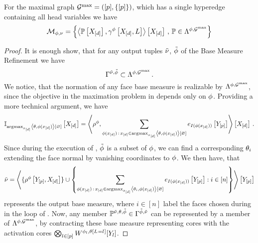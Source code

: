 \begin{theorem}%
	For the maximal graph $\mathcal{G}^{\mathrm{max}}=([p],\{[p]\})$, which has a single hyperedge containing all head variables we have
	\begin{align*}
		\mathcal{M}_{\phi,\nu} = \left\{ \left\langle \mathbb{P}\left[X_{[d]}\right],\gamma^{\phi}\left[X_{[d]},L\right]\right\rangle \left[ X_{[d]} \right] \, , \, \mathbb{P} \in\Lambda^{\phi,\mathcal{G}^{\mathrm{max}}} \right\}
	\end{align*}
\end{theorem}
\begin{proof}
	It is enough show, that for any output tuples $\tilde{\nu}$, $\tilde{\phi}$ of the Base Measure Refinement  we have
		\[ \Gamma^{\tilde{\nu},\tilde{\phi}} \subset  \Lambda^{\phi,\mathcal{G}^{\mathrm{max}}} \, . \]
	We notice, that the normation of any face base measure is realizable by $\Lambda^{\phi,\mathcal{G}^{\mathrm{max}}}$, since the objective in the maximation problem in  depends only on $\phi$.
	Providing a more technical argument, we have
	\begin{align*}
		\mathbb{I}_{\mathrm{argmax}_{x_{[d]}} \left\langle \theta,\phi(x_{[d]})\right\rangle \left[ \varnothing \right]}\left[X_{[d]}\right]
		= \left\langle 
			\rho^{\phi},
			\sum_{\phi(x_{[d]}) \, : \, x_{[d]} \in \mathrm{argmax}_{x_{[d]}} \left\langle \theta,\phi(x_{[d]})\right\rangle \left[ \varnothing \right] }
			e_{I(\phi(x_{[d]}))}\left[Y_{[p]}\right]
		\right\rangle \left[ X_{[d]} \right] \, .
	\end{align*}
	Since during the execution of , $\tilde{\phi}$ is a subset of $\phi$, we can find a corresponding $\theta_{i}$ extending the face normal by vanishing coordinates to $\phi$.
	We then have, that 
	\begin{align*}
		\tilde{\nu} = \left\langle 
			\{\rho^{\phi}\left[Y_{[p]},X_{[d]}\right]\} \cup
			\left\{\sum_{\phi(x_{[d]}) \, : \, x_{[d]} \in \mathrm{argmax}_{x_{[d]}} \left\langle \theta_{i},\phi(x_{[d]})\right\rangle \left[ \varnothing \right] } 
			e_{I(\phi(x_{[d]}))}\left[Y_{[p]}\right]
			: i \in [n] \right\}
			\right\rangle \left[ Y_{[p]} \right] 
	\end{align*}
	represents the output base measure, where $i\in[n]$ label the faces chosen during in the loop of .
	Now, any member $\mathbb{P}^{\tilde{\nu},\theta,\tilde{\phi}}\in\Gamma^{\tilde{\phi},\tilde{\nu}}$ can be represented by a member of  $\Lambda^{\phi,\mathcal{G}^{\mathrm{max}}}$, by contracting these base measure representing cores with the activation cores $\bigotimes_{l\in[p]}W^{\phi_{l},\theta\left[L_{}=l_{}\right]}[Y_{l}]$.
\end{proof}

